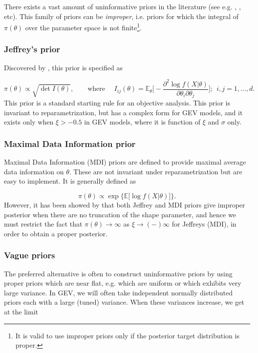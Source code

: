 There exists a vast amount of uninformative priors in the literature (see e.g. \cite{yang_catalog_1996}, \cite{ni_noninformative_2003}, etc).
This family of priors can be \emph{improper}, i.e. priors for which the integral of $\pi(\theta)$ over the parameter space is not finite\footnote{It is valid to use improper priors only if the posterior target distribution is proper.}. 


\subsubsection*{Jeffrey's prior} 
Discovered by \citet{Jeffreys61a}, this prior is specified as 

\begin{equation}
\pi(\theta)\propto \sqrt{\det I(\theta)}, \qquad \text{where }\quad I_{ij}(\theta)=\mathbb{E}_{\theta}\Bigg[-\frac{\partial^2\log f(X|\theta)}{\partial\theta_i\partial\theta_j}\Bigg]; \ \ i,j= 1,\dots,d.
\end{equation}
This prior is a standard starting rule for an objective analysis.
This prior is invariant to reparametrization, but has a complex form for GEV models, and it exists only when $\xi>-0.5$ in GEV models, where it is function of $\xi$ and $\sigma$ only.


\subsubsection*{Maximal Data Information  prior}
Maximal Data Information (MDI) priors are defined to provide maximal average data information on $\theta$. These are not invariant under reparametrization but are easy to implement. It is generally defined as 

\begin{equation*}
\pi(\theta)\propto \exp\Big\{ \mathbb{E}\big[\log f(X|\theta
)\big]\Big\}.
\end{equation*}
However, it has been showed by \cite{northrop_posterior_2016} that 
both Jeffrey and MDI priors give improper posterior when there are no truncation of the shape parameter, and hence we must restrict the fact that $\pi(\theta)\rightarrow\infty$ as $\xi\rightarrow(-)\infty$ for Jeffreys (MDI), in order to obtain a proper posterior.

\subsubsection*{Vague priors}
The preferred alternative is often to construct uninformative priors by using proper priors which are near flat, e.g. which are uniform or which exhibits very large variance.
In GEV, we will often take independent normally distributed priors each with a large (tuned) variance. When these variances increase, we get at the limit


